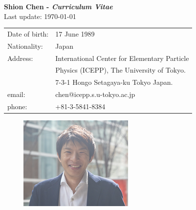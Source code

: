 \documentclass[12pt]{article}
\begin{document}

\begin{center}
  \large{\textbf{Shion Chen  - {\it Curriculum Vitae}   }} \\
  \vspace{2mm}
  \small{Last update: \today} 
\end{center}

\begin{minipage}[t]{.8\textwidth}
    \begin{tabular}{ll}
      Date of birth: & 17 June 1989 \\
      Nationality: & Japan \\
      Address: & International Center for Elementary Particle \\ 
               & Physics (ICEPP), The University of Tokyo. \\
               & 7-3-1 Hongo Setagaya-ku Tokyo Japan. \\
      email: &  chen@icepp.s.u-tokyo.ac.jp \\
      phone: & +81-3-5841-8384 \\
    \end{tabular}
\end{minipage}
\hfill
\begin{minipage}[c]{.15\textwidth}
  \begin{figure}[H]
    \includegraphics{photo_for_job.png}
  \end{figure}
\end{minipage}
\end{document}
